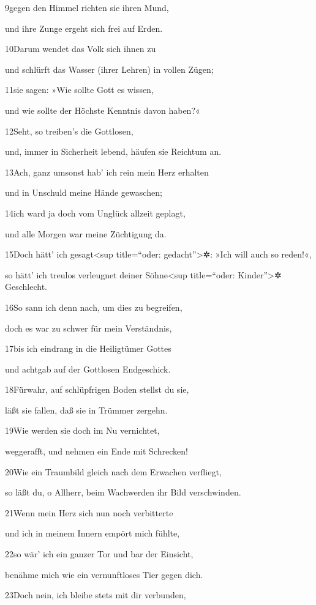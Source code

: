 9gegen den Himmel richten sie ihren Mund,

und ihre Zunge ergeht sich frei auf Erden.

10Darum wendet das Volk sich ihnen zu

und schlürft das Wasser (ihrer Lehren) in vollen Zügen;

11sie sagen: »Wie sollte Gott es wissen,

und wie sollte der Höchste Kenntnis davon haben?«

12Seht, so treiben's die Gottlosen,

und, immer in Sicherheit lebend, häufen sie Reichtum an.

13Ach, ganz umsonst hab' ich rein mein Herz erhalten

und in Unschuld meine Hände gewaschen;

14ich ward ja doch vom Unglück allzeit geplagt,

und alle Morgen war meine Züchtigung da.

15Doch hätt' ich gesagt\textless sup title=``oder:
gedacht''\textgreater✲: »Ich will auch so reden!«,

so hätt' ich treulos verleugnet deiner Söhne\textless sup title=``oder:
Kinder''\textgreater✲ Geschlecht.

16So sann ich denn nach, um dies zu begreifen,

doch es war zu schwer für mein Verständnis,

17bis ich eindrang in die Heiligtümer Gottes

und achtgab auf der Gottlosen Endgeschick.

18Fürwahr, auf schlüpfrigen Boden stellst du sie,

läßt sie fallen, daß sie in Trümmer zergehn.

19Wie werden sie doch im Nu vernichtet,

weggerafft, und nehmen ein Ende mit Schrecken!

20Wie ein Traumbild gleich nach dem Erwachen verfliegt,

so läßt du, o Allherr, beim Wachwerden ihr Bild verschwinden.

21Wenn mein Herz sich nun noch verbitterte

und ich in meinem Innern empört mich fühlte,

22so wär' ich ein ganzer Tor und bar der Einsicht,

benähme mich wie ein vernunftloses Tier gegen dich.

23Doch nein, ich bleibe stets mit dir verbunden,

